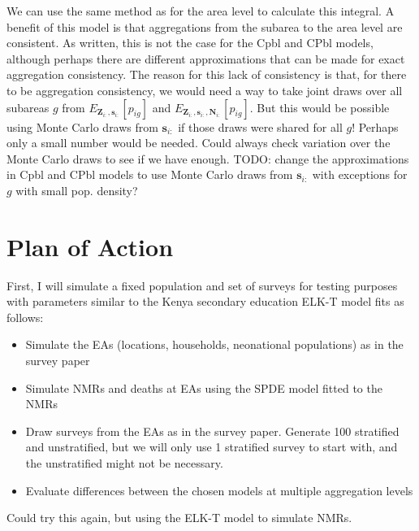 \documentclass[12pt]{article}
\begin{document}
We can use the same method as for the area level to calculate this integral. A benefit of this model is that aggregations from the subarea to the area level are consistent. As written, this is not the case for the Cpbl and CPbl models, although perhaps there are different approximations that can be made for exact aggregation consistency. The reason for this lack of consistency is that, for there to be aggregation consistency, we would need a way to take joint draws over all subareas $g$ from $E_{\boldsymbol{Z}_{i:}, \boldsymbol{s}_{i:}} \left [p_{ig} \right ]$ and $E_{\boldsymbol{Z}_{i:}, \boldsymbol{s}_{i:}, \boldsymbol{N}_{i:}} \left [p_{ig} \right ]$. But this would be possible using Monte Carlo draws from $\boldsymbol{s}_{i:}$ if those draws were shared for all $g$! Perhaps only a small number would be needed. Could always check variation over the Monte Carlo draws to see if we have enough. TODO: change the approximations in Cpbl and CPbl models to use Monte Carlo draws from $\boldsymbol{s}_{i:}$ with exceptions for $g$ with small pop. density?

\section{Plan of Action}

First, I will simulate a fixed population and set of surveys for testing purposes with parameters similar to the Kenya secondary education ELK-T model fits as follows:
\begin{itemize}
\item Simulate the EAs (locations, households, neonational populations) as in the survey paper
\item Simulate NMRs and deaths at EAs using the SPDE model fitted to the NMRs
\item Draw surveys from the EAs as in the survey paper. Generate 100 stratified and unstratified, but we will only use 1 stratified survey to start with, and the unstratified might not be necessary.
\item Evaluate differences between the chosen models at multiple aggregation levels
\end{itemize}
Could try this again, but using the ELK-T model to simulate NMRs.
\end{document}
